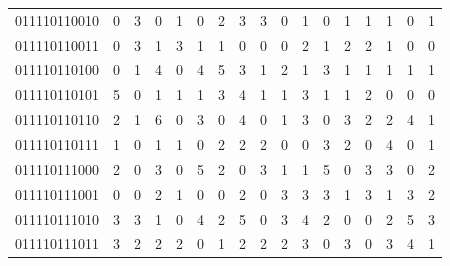 \documentclass[10pt,a4paper]{article}
\begin{document}
\begin{longtable}{ |c|c|c|c|c|c|c|c|c|c|c|c|c|c|c|c|c| }
    011110110010              & 0                            & 3                                & 0                            & 1                              & 0   & 2   & 3   & 3   & 0   & 1   & 0   & 1   & 1   & 1   & 0   & 1   \\
    011110110011              & 0                            & 3                                & 1                            & 3                              & 1   & 1   & 0   & 0   & 0   & 2   & 1   & 2   & 2   & 1   & 0   & 0   \\
    011110110100              & 0                            & 1                                & 4                            & 0                              & 4   & 5   & 3   & 1   & 2   & 1   & 3   & 1   & 1   & 1   & 1   & 1   \\
    011110110101              & 5                            & 0                                & 1                            & 1                              & 1   & 3   & 4   & 1   & 1   & 3   & 1   & 1   & 2   & 0   & 0   & 0   \\
    011110110110              & 2                            & 1                                & 6                            & 0                              & 3   & 0   & 4   & 0   & 1   & 3   & 0   & 3   & 2   & 2   & 4   & 1   \\
    011110110111              & 1                            & 0                                & 1                            & 1                              & 0   & 2   & 2   & 2   & 0   & 0   & 3   & 2   & 0   & 4   & 0   & 1   \\
    011110111000              & 2                            & 0                                & 3                            & 0                              & 5   & 2   & 0   & 3   & 1   & 1   & 5   & 0   & 3   & 3   & 0   & 2   \\
    011110111001              & 0                            & 0                                & 2                            & 1                              & 0   & 0   & 2   & 0   & 3   & 3   & 3   & 1   & 3   & 1   & 3   & 2   \\
    011110111010              & 3                            & 3                                & 1                            & 0                              & 4   & 2   & 5   & 0   & 3   & 4   & 2   & 0   & 0   & 2   & 5   & 3   \\
    011110111011              & 3                            & 2                                & 2                            & 2                              & 0   & 1   & 2   & 2   & 2   & 3   & 0   & 3   & 0   & 3   & 4   & 1   \\

\end{longtable}
\end{document}

